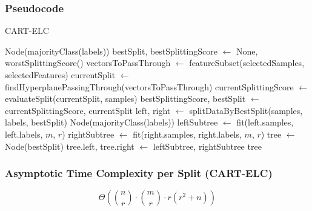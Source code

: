 \documentclass[10pt]{beamer}
\begin{document}
\begin{frame}
	\frametitle{Pseudocode}

	\begin{algorithm}[H]
		\tiny
		\caption{CART-ELC}
	\begin{algorithmic}[1]
			\State \Return Node(majorityClass(labels)) 
		\EndIf
		\State bestSplit, bestSplittingScore $\gets$ None, worstSplittingScore()
				\State vectorsToPassThrough $\gets$ featureSubset(selectedSamples, selectedFeatures)
				\State currentSplit $\gets$ findHyperplanePassingThrough(vectorsToPassThrough)
				\State currentSplittingScore $\gets$ evaluateSplit(currentSplit, samples)
					\State bestSplittingScore, bestSplit  $\gets$ currentSplittingScore, currentSplit
				\EndIf
			\EndFor
		\EndFor
		\State left, right $\gets$ splitDataByBestSplit(samples, labels, bestSplit)
			\State \Return Node(majorityClass(labels)) 
		\EndIf
		\State leftSubtree $\gets$ fit(left.samples, left.labels, $m$, $r$)
		\State rightSubtree $\gets$ fit(right.samples, right.labels, $m$, $r$)
		\State tree $\gets$ Node(bestSplit)
		\State tree.left, tree.right $\gets$ leftSubtree, rightSubtree
		\State \Return tree
	\EndFunction
	\end{algorithmic}
	\end{algorithm}
\end{frame}

\begin{frame}
	\frametitle{Asymptotic Time Complexity per Split (CART-ELC)}
\[
	\Theta\left( \binom{n}{r} \cdot \binom{m}{r} \cdot r(r^2 + n) \right)
\]

\end{frame}
\end{document}
